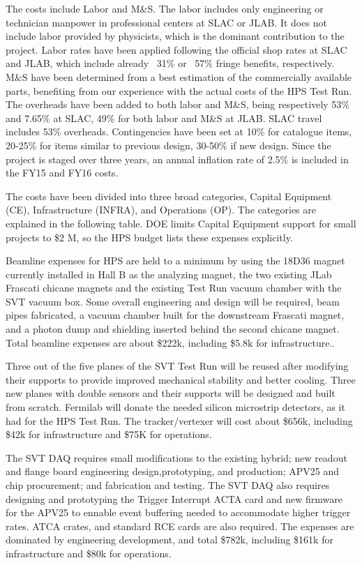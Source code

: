 The costs include Labor and M\&S. The labor includes only engineering or technician manpower in professional centers at SLAC or JLAB. It does not 
include labor provided by physicists, which is the dominant contribution to the project. Labor rates have been applied following 
the official shop rates at SLAC and JLAB, which include already ~31\% or ~57\% fringe benefits, respectively. M\&S have been determined from a best estimation 
of the commercially available parts,  benefiting from our experience with the actual costs of the HPS Test Run. The overheads have been added to both labor 
and M\&S, being respectively 53\% and 7.65\% at SLAC, 49\% for both labor and M\&S at JLAB. SLAC travel includes 53\% overheads. 
Contingencies have been set at 10\% for catalogue items,  20-25\% for items similar to previous design, 30-50\%  if new design. Since the project is staged 
over three years, an annual inflation rate of 2.5\%  is included in the FY15 and FY16 costs.

The costs have been divided into three broad categories, Capital Equipment (CE), Infrastructure (INFRA), and Operations (OP). 
The categories are explained in the following table. DOE limits Capital Equipment support for small projects to \$2 M, so the HPS budget lists these
expenses explicitly.


Beamline expenses for HPS are held to a minimum by using the 18D36 magnet currently installed in Hall B as the analyzing magnet, the 
two existing JLab Frascati chicane magnets and the existing Test Run vacuum chamber with the SVT vacuum box.  Some overall engineering and design will be 
required, beam pipes fabricated, a vacuum chamber built for the downstream 
Frascati magnet, and a photon dump and shielding inserted behind the second chicane magnet. Total beamline expenses are about \$222k, including \$5.8k  for infrastructure..

Three out of the five planes of the SVT Test Run will be reused after modifying their supports to provide improved 
mechanical stability and better cooling. Three new planes with double sensors and their supports will be designed and built from 
scratch. Fermilab will donate the needed silicon microstrip detectors, as it had for the HPS Test Run. The tracker/vertexer  will cost about \$656k, including \$42k for 
infrastructure and \$75K for operations.

The SVT DAQ requires small modifications to the  existing hybrid; new readout and flange board engineering design,prototyping, and 
production; 
APV25 and chip procurement; and  fabrication and testing. The SVT DAQ also requires designing and prototyping the Trigger Interrupt 
ACTA card and new firmware for the APV25 to ennable event buffering needed to accommodate higher trigger rates. ATCA crates, and standard 
RCE cards are also required. The expenses are dominated by engineering development, and total \$782k, including \$161k for infrastructure and \$80k for operations.  

